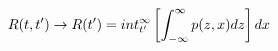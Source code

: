 \begin{equation}
R(t,t') \to R(t') = \\int_{t'}^\infty \left[ \int_{-\infty}^\infty p(z,x) dz \right]dx
\end{equation}